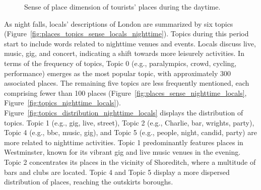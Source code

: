 \documentclass{article}
\theoremstyle{remark}
\begin{document}
\begin{figure}[!h]
    \caption{Sense of place dimension of tourists' places during the daytime.}
    \label{fig:places_topics_sense_tourists_daytime}
\end{figure}

As night falls, locals' descriptions of London are summarized by six topics (Figure~\ref{fig:places_topics_sense_locals_nighttime}). Topics during this period start to include words related to nighttime venues and events. Locals discuss live, music, gig, and concert, indicating a shift towards more leisurely activities. In terms of the frequency of topics, Topic 0 (e.g., paralympics, crowd, cycling, performance) emerges as the most popular topic, with approximately 300 associated places. The remaining five topics are less frequently mentioned, each comprising fewer than 100 places (Figure~\ref{fig:places_sense_nighttime_locals}, Figure~\ref{fig:topics_nighttime_locals}). Figure~\ref{fig:topics_distribution_nighttime_locals} displays the distribution of topics. Topic 1 (e.g., gig, live, street), Topic 2 (e.g., Charlie, bar, wrights, party), Topic 4 (e.g., bbc, music, gig), and Topic 5 (e.g., people, night, candid, party) are more related to nighttime activities. Topic 1 predominantly features places in Westminster, known for its vibrant gig and live music venues in the evening. Topic 2 concentrates its places in the vicinity of Shoreditch, where a multitude of bars and clubs are located. Topic 4 and Topic 5 display a more dispersed distribution of places, reaching the outskirts boroughs.
\end{document}
